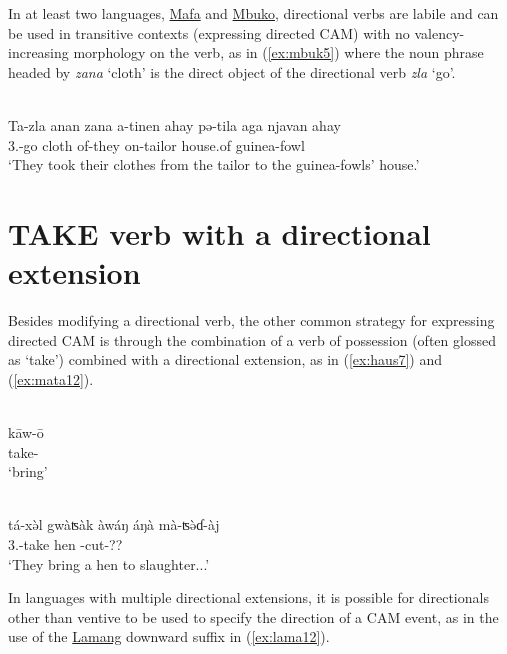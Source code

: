 In at least two languages, \hyperref[mafa]{Mafa} and \hyperref[mbuk]{Mbuko}, directional verbs are labile and can be used in transitive contexts (expressing directed CAM) with no valency-increasing morphology on the verb, as in (\ref{ex:mbuk5}) where the noun phrase headed by \textit{zana} `cloth' is the direct object of the directional verb \textit{zla} `go'. 

\ea\label{ex:mbuk5}
 \\
\gll Ta-zla anan zana a-tinen ahay pə-tila aga njavan ahay\\
3.-go  cloth of-they  on-tailor house.of guinea-fowl \\
\glt `They took their clothes from the tailor to the guinea-fowls’ house.'
\z 

\section{TAKE verb with a directional extension} \label{sec:takecam}

Besides modifying a directional verb, the other common strategy for expressing directed CAM is through the combination of a verb of possession (often glossed as `take') combined with a directional extension, as in (\ref{ex:haus7}) and (\ref{ex:mata12}).

\ea\label{ex:haus7}
 \\
\gll kāw-ō \\
take- \\
\glt `bring'

\ex\label{ex:mata12}
 \\
\gll  tá-xə̀l gwàʦàk àwáŋ áŋà  mà-ʦə̀ɗ-àj 	\\
3.-take hen   -cut-??		\\
\glt `They bring a hen to slaughter...'
\z 

In languages with multiple directional extensions, it is possible for directionals other than ventive to be used to specify the direction of a CAM event, as in the use of the \hyperref[lama]{Lamang} downward suffix in (\ref{ex:lama12}). 

